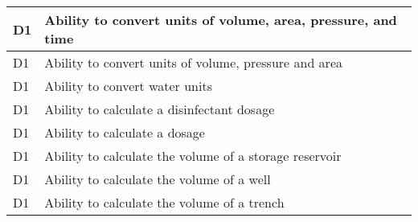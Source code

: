 \begin{table}[H]
\begin{tabular}{| m{1cm} | m{15cm} |}
D1 & Ability to convert   units of volume, area, pressure, and time               \\ \hline
D1 & Ability to convert   units of volume, pressure and area                      \\ \hline
D1 & Ability to convert   water units                                             \\ \hline
D1 & Ability to calculate   a disinfectant dosage                                 \\ \hline
D1 & Ability to calculate   a dosage                                              \\ \hline
D1 & Ability to calculate   the volume of a storage reservoir                     \\ \hline
D1 & Ability to calculate   the volume of a well                                  \\ \hline
D1 & Ability to calculate   the volume of a trench                                \\ \hline

\end{tabular}
\end{table}

\newpage



